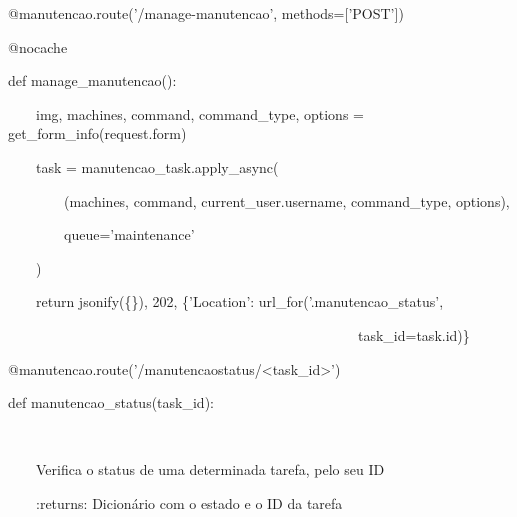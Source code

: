     \bigskip


    \bigskip

{\ttfamily\color[rgb]{0.10980392,0.10980392,0.10980392}
    @manutencao.route('/manage-manutencao', methods=['POST'])}

{\ttfamily\color[rgb]{0.10980392,0.10980392,0.10980392}
    @nocache}

{\ttfamily\color[rgb]{0.10980392,0.10980392,0.10980392}
    def manage\_manutencao():}

{\ttfamily\color[rgb]{0.10980392,0.10980392,0.10980392}
    \ \ \ \ img, machines, command, command\_type, options = get\_form\_info(request.form)}

{\ttfamily\color[rgb]{0.10980392,0.10980392,0.10980392}
    \ \ \ \ task = manutencao\_task.apply\_async(}

            {\ttfamily\color[rgb]{0.10980392,0.10980392,0.10980392}
            \ \ \ \ \ \ \ \ (machines, command, current\_user.username, command\_type, options),}

            {\ttfamily\color[rgb]{0.10980392,0.10980392,0.10980392}
            \ \ \ \ \ \ \ \ queue='maintenance'}

            {\ttfamily\color[rgb]{0.10980392,0.10980392,0.10980392}
            \ \ \ \ )}

{\ttfamily\color[rgb]{0.10980392,0.10980392,0.10980392}
    \ \ \ \ return jsonify(\{\}), 202, \{'Location': url\_for('.manutencao\_status',}

            {\ttfamily\color[rgb]{0.10980392,0.10980392,0.10980392}
            \ \ \ \ \ \ \ \ \ \ \ \ \ \ \ \ \ \ \ \ \ \ \ \ \ \ \ \ \ \ \ \ \ \ \ \ \ \ \ \ \ \ \ \ \ \ \ \ \ \ task\_id=task.id)\}}


    \bigskip


    \bigskip

{\ttfamily\color[rgb]{0.10980392,0.10980392,0.10980392}
    @manutencao.route('/manutencaostatus/{\textless}task\_id{\textgreater}')}

{\ttfamily\color[rgb]{0.10980392,0.10980392,0.10980392}
    def manutencao\_status(task\_id):}

{\ttfamily\color[rgb]{0.10980392,0.10980392,0.10980392}
    \ \ \ \ {\textquotedbl}{\textquotedbl}{\textquotedbl}}

{\ttfamily\color[rgb]{0.10980392,0.10980392,0.10980392}
    \ \ \ \ Verifica o status de uma determinada tarefa, pelo seu ID}


    \bigskip

{\ttfamily\color[rgb]{0.10980392,0.10980392,0.10980392}
    \ \ \ \ :returns: Dicion\'ario com o estado e o ID da tarefa}

